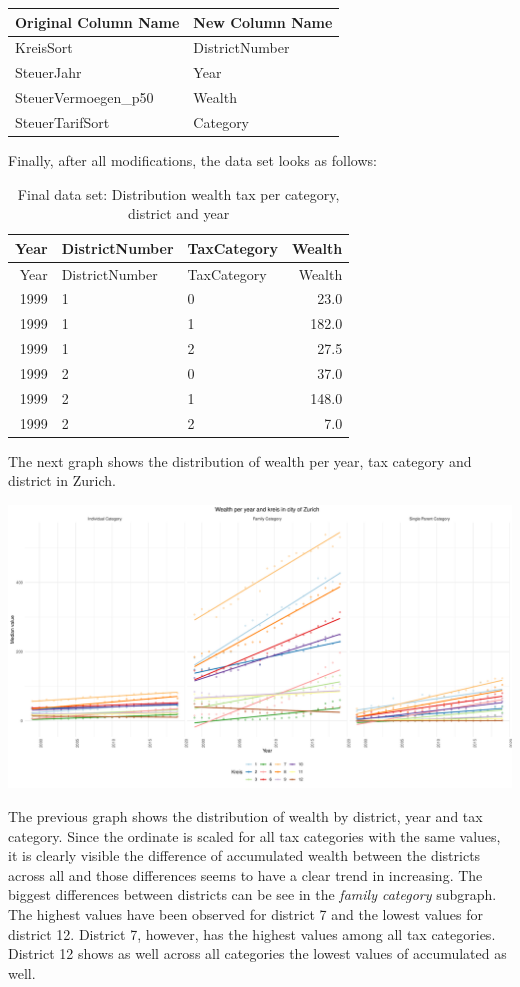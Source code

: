\documentclass[
]{article}
\begin{document}
\begin{longtable}[]{@{}ll@{}}
\toprule
Original Column Name & New Column Name \\
\midrule
\endhead
KreisSort & DistrictNumber \\
SteuerJahr & Year \\
SteuerVermoegen\_p50 & Wealth \\
SteuerTarifSort & Category \\
\bottomrule
\end{longtable}

Finally, after all modifications, the data set looks as follows:

\begin{longtable}[]{@{}rllr@{}}
\caption{Final data set: Distribution wealth tax per category, district
and year}\tabularnewline
\toprule
Year & DistrictNumber & TaxCategory & Wealth \\
\midrule
\endfirsthead
\toprule
Year & DistrictNumber & TaxCategory & Wealth \\
\midrule
\endhead
1999 & 1 & 0 & 23.0 \\
1999 & 1 & 1 & 182.0 \\
1999 & 1 & 2 & 27.5 \\
1999 & 2 & 0 & 37.0 \\
1999 & 2 & 1 & 148.0 \\
1999 & 2 & 2 & 7.0 \\
\bottomrule
\end{longtable}

The next graph shows the distribution of wealth per year, tax category
and district in Zurich.

\includegraphics{report_files/figure-latex/plot_wealth-1.pdf}

The previous graph shows the distribution of wealth by district, year
and tax category. Since the ordinate is scaled for all tax categories
with the same values, it is clearly visible the difference of
accumulated wealth between the districts across all and those
differences seems to have a clear trend in increasing. The biggest
differences between districts can be see in the \emph{family category}
subgraph. The highest values have been observed for district 7 and the
lowest values for district 12. District 7, however, has the highest
values among all tax categories. District 12 shows as well across all
categories the lowest values of accumulated as well.
\end{document}
